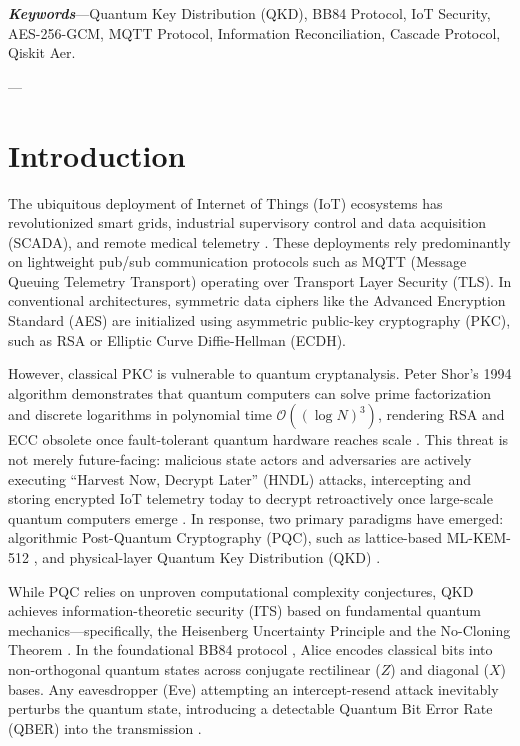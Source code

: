\documentclass[journal,10pt,twocolumn]{article}
\begin{document}
\textbf{\textit{Keywords}}---Quantum Key Distribution (QKD), BB84 Protocol, IoT Security, AES-256-GCM, MQTT Protocol, Information Reconciliation, Cascade Protocol, Qiskit Aer.

---

\section{Introduction}
The ubiquitous deployment of Internet of Things (IoT) ecosystems has revolutionized smart grids, industrial supervisory control and data acquisition (SCADA), and remote medical telemetry \cite{kumar2026performance}. These deployments rely predominantly on lightweight pub/sub communication protocols such as MQTT (Message Queuing Telemetry Transport) \cite{banks2019mqtt} operating over Transport Layer Security (TLS). In conventional architectures, symmetric data ciphers like the Advanced Encryption Standard (AES) \cite{dworkin2007sp80038d} are initialized using asymmetric public-key cryptography (PKC), such as RSA or Elliptic Curve Diffie-Hellman (ECDH).

However, classical PKC is vulnerable to quantum cryptanalysis. Peter Shor's 1994 algorithm demonstrates that quantum computers can solve prime factorization and discrete logarithms in polynomial time $\mathcal{O}((\log N)^3)$, rendering RSA and ECC obsolete once fault-tolerant quantum hardware reaches scale \cite{tupkary2026security}. This threat is not merely future-facing: malicious state actors and adversaries are actively executing ``Harvest Now, Decrypt Later'' (HNDL) attacks, intercepting and storing encrypted IoT telemetry today to decrypt retroactively once large-scale quantum computers emerge \cite{rehman2025qesif}. In response, two primary paradigms have emerged: algorithmic Post-Quantum Cryptography (PQC), such as lattice-based ML-KEM-512 \cite{nist2024fips203}, and physical-layer Quantum Key Distribution (QKD) \cite{alshowkan2022experimental}.

While PQC relies on unproven computational complexity conjectures, QKD achieves information-theoretic security (ITS) based on fundamental quantum mechanics---specifically, the Heisenberg Uncertainty Principle and the No-Cloning Theorem \cite{bennett1995generalized}. In the foundational BB84 protocol \cite{brassard1994secret}, Alice encodes classical bits into non-orthogonal quantum states across conjugate rectilinear ($Z$) and diagonal ($X$) bases. Any eavesdropper (Eve) attempting an intercept-resend attack inevitably perturbs the quantum state, introducing a detectable Quantum Bit Error Rate (QBER) into the transmission \cite{fiorini2024estimating, das2026simulating}.
\end{document}
